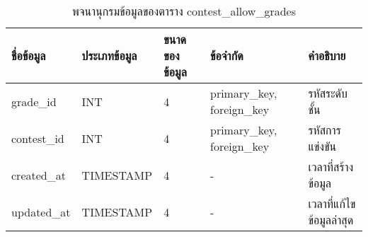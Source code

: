 \begin{table}[H]
    \caption{พจนานุกรมข้อมูลของตาราง contest\_allow\_grades}
    \label{tab:database-contest-allow_grades}
    \begin{tabularx}{\textwidth}{ | p{2.25cm} | p{2.20cm} | p{2.45cm} | p{2cm} | X | }
    \hline
    \textbf{ชื่อข้อมูล} & \textbf{ประเภทข้อมูล} & \textbf{ขนาดของข้อมูล} & \textbf{ข้อจำกัด} & \textbf{คำอธิบาย} \\
    \hline
    grade\_id & INT & 4 & primary\_key, foreign\_key & รหัสระดับชั้น \\
    \hline
    contest\_id & INT & 4 & primary\_key, foreign\_key & รหัสการแข่งขัน \\
    \hline
    created\_at & TIMESTAMP & 4 & - & เวลาที่สร้างข้อมูล \\
    \hline
    updated\_at & TIMESTAMP & 4 & - & เวลาที่แก้ไขข้อมูลล่าสุด \\
    \hline
    \end{tabularx}
\end{table}